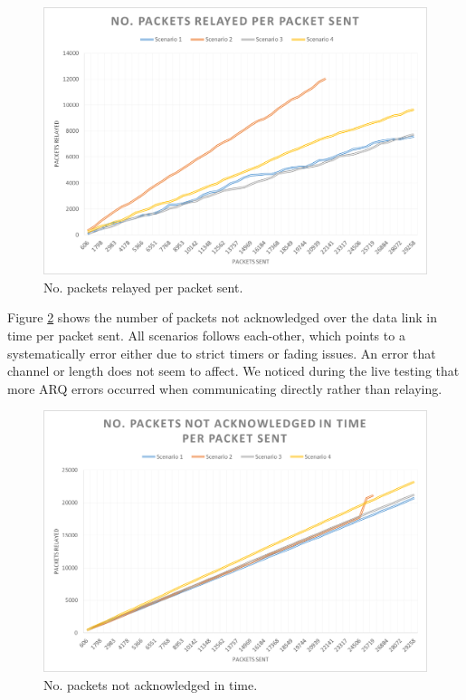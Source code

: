 \begin{figure}[h]
	\centering
	\includegraphics[width=1\linewidth]{results/NoPacketsRelayed}
	\caption{No. packets relayed per packet sent.}
	\label{fig:nopacketsrelayed}
\end{figure}

\noindent Figure \ref{fig:nopacketsnotackintime} shows the number of packets not acknowledged over the data link in time per packet sent. All scenarios follows each-other, which points to a systematically error either due to strict timers or fading issues. An error that channel or length does not seem to affect. We noticed during the live testing that more ARQ errors occurred when communicating directly rather than relaying.

\begin{figure}[h]
	\centering
	\includegraphics[width=1\linewidth]{results/NoPacketsNotACKInTime}
	\caption{No. packets not acknowledged in time.}
	\label{fig:nopacketsnotackintime}
\end{figure}

